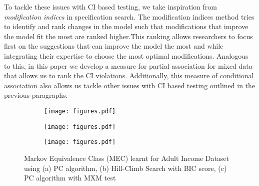 \documentclass{uai2025} %
\begin{document}
To tackle these issues with CI based testing, we take inspiration from
\emph{modification indices} in specification search. The modification indices
method tries to identify and rank changes in the model such that modifications
that improve the model fit the most are ranked higher.This ranking allows
researchers to focus first on the suggestions that can improve the model the
most and while integrating their expertise to choose the most optimal
modifications. Analogous to this, in this paper we develop a measure for
partial association for mixed data that allows us to rank the CI violations.
Additionally, this measure of conditional association also allows us tackle
other issues with CI based testing outlined in the previous paragraphs.


\begin{figure}
\begin{subfigure}{0.5 \textwidth}
	\texttt{[image: figures.pdf]}
\end{subfigure}
\begin{subfigure}{0.5 \textwidth}
	\texttt{[image: figures.pdf]}
\end{subfigure}
\begin{subfigure}{0.5\textwidth}
	\texttt{[image: figures.pdf]}
\end{subfigure}

\caption{Markov Equivalence Class (MEC) learnt for Adult Income Dataset using (a) PC algorithm, (b) Hill-Climb Search with BIC score, (c) PC algorithm with MXM test}
\label{fig:intro}
\end{figure}
\end{document}

